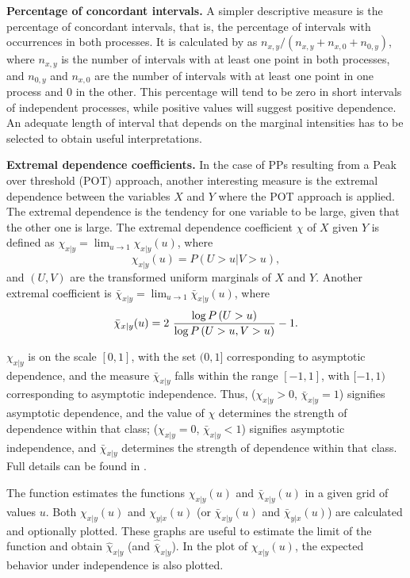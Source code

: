 \textbf{Percentage of  concordant intervals.}	 A simpler descriptive measure   is the percentage of  concordant intervals, that is,  the percentage of intervals with occurrences in both processes. It is calculated by   as $n_{x,y}/(n_{x,y}+n_{x,0}+ n_{0,y})$, where $n_{x,y}$ is the number  of intervals with at least one point in both processes, and  $n_{0,y}$  and  $n_{x,0}$  are the number of intervals with at least one point in  one process and 0 in the other.  This percentage will tend to be zero in short intervals of independent processes, while  positive values  will suggest positive dependence. An adequate length of interval  that depends on the  marginal intensities has to be selected to obtain useful interpretations. 

\textbf{Extremal dependence coefficients.} In the case of  PPs resulting from a Peak over threshold (POT) approach, another interesting measure is the extremal dependence between the variables $X$ and $Y$ where the POT approach is applied. The extremal dependence is the tendency for one variable to be large, given that the other one is large. The  extremal dependence coefficient $\chi$  of $X$ given $Y$  is defined as $\chi_{x|y}= \lim_{u \to 1} \chi_{x|y}(u)$, where
$$\chi_{x|y}(u)= P\left(U>u |V>u\right),$$
and  $(U,V)$ are  the  transformed uniform marginals of  $X$ and $Y$. Another extremal
coefficient  is 
$\bar \chi_{x|y}= \lim_{u \to 1} \bar \chi_{x|y}(u)$, where 
$$\bar \chi_{x|y}(u)= 2 \ {\log P\left(U>u\right) \over \log P\left(U>u, V>u\right)}-1.$$


$\chi_{x|y}$ is on the scale $[0, 1]$, with the set $(0, 1]$ corresponding to asymptotic
dependence, and the measure $\bar \chi_{x|y}$ falls within the range $[-1, 1]$, with  $[-1, 1)$ corresponding to asymptotic independence. 
Thus,  ($\chi_{x|y} > 0$, $\bar \chi_{x|y} =1$) signifies asymptotic dependence,  and the value of $\chi$ determines  the strength of dependence within that class;  ($\chi_{x|y}=0$, $\bar \chi_{x|y} <1$) signifies asymptotic independence,  and $\bar \chi_{x|y}$  determines the strength of dependence within that class.
Full details can be found in \citet{Coles99}. 

The function  estimates the  functions  $\chi_{x|y}(u)$ and $ \bar \chi_{x|y}(u)$ in a given grid of values $u$. Both $\chi_{x|y}(u)$ and   $\chi_{y|x}(u)$  (or $\bar \chi_{x|y}(u)$ and   $\bar \chi_{y|x}(u)$) are calculated and optionally plotted. These graphs are useful to estimate the limit of the function and obtain $\hat \chi_{x|y}$ (and $\widehat{\bar \chi}_{x|y}$). In the plot of  $\chi_{x|y}(u)$, the expected behavior under independence  is also plotted.







